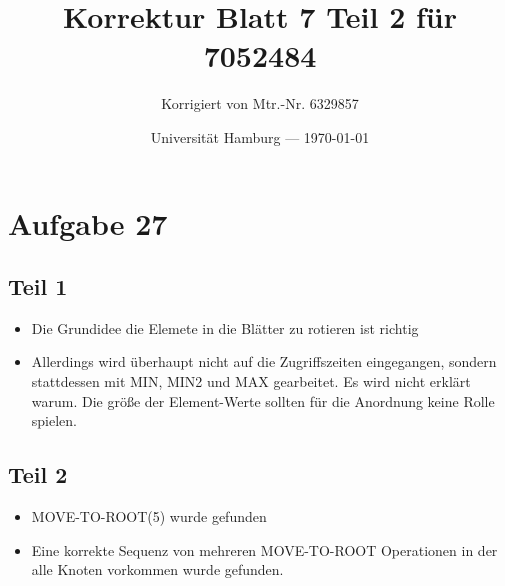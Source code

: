 \documentclass[parskip=half,a4paper]{scrartcl}
\title{Korrektur Blatt 7 Teil 2 für 7052484}
\author{Korrigiert von Mtr.-Nr. 6329857}
\date{Universität Hamburg --- \today}
\begin{document}
\maketitle %

\section{Aufgabe 27}

\subsection{Teil 1}


\begin{itemize}
    \item Die Grundidee die Elemete in die Blätter zu rotieren ist richtig
    \item Allerdings wird überhaupt nicht auf die Zugriffszeiten eingegangen, sondern stattdessen mit MIN, MIN2 und MAX gearbeitet. Es wird nicht erklärt warum. Die größe der Element-Werte sollten für die Anordnung keine Rolle spielen.
\end{itemize}

\subsection{Teil 2}

\begin{itemize}
    \item MOVE-TO-ROOT(5) wurde gefunden
    \item Eine korrekte Sequenz von mehreren MOVE-TO-ROOT Operationen in der alle Knoten vorkommen wurde gefunden.
\end{itemize}
\end{document}
